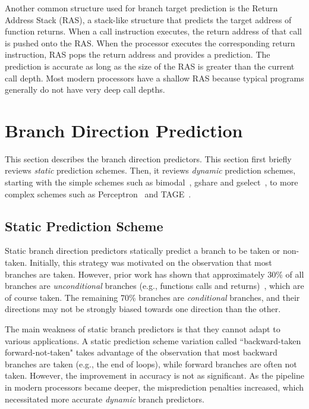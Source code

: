 Another common structure used for branch target prediction is the Return Address Stack (RAS),  a stack-like structure that predicts the target address of function returns. When a call instruction executes, the return address of that call is pushed onto the RAS. When the processor executes the corresponding return instruction, RAS pops the return address and provides a prediction. The prediction is accurate as long as the size of the RAS is greater than the current call depth. Most modern processors have a shallow RAS because typical programs generally do not have very deep call depths.


\section{Branch Direction Prediction}
\label{sec:background:dirpred}
This section describes the branch direction predictors. This section first briefly reviews \textit{static} prediction schemes. Then, it reviews \textit{dynamic} prediction schemes, starting with the simple schemes such as bimodal~\cite{bimodal}, gshare and gselect~\cite{McFarling}, to more complex schemes such as Perceptron~\cite{perceptron} and TAGE~\cite{tage}.

\subsection{Static Prediction Scheme}
\label{sec:background:dirpred:static}
Static branch direction predictors statically predict a branch to be taken or non-taken. Initially, this strategy was motivated on the observation that most branches are taken. However, prior work has shown that approximately 30\% of all branches are \textit{unconditional} branches (e.g., functions calls and returns)~\cite{histogram}, which are of course taken. The remaining 70\% branches are \textit{conditional} branches, and their directions may not be strongly biased towards one direction than the other.

The main weakness of static branch predictors is that they cannot adapt to various applications. A static prediction scheme variation called ``backward-taken forward-not-taken" takes advantage of the observation that most backward branches are taken (e.g., the end of loops), while forward branches are often not taken. However, the improvement in accuracy is not as significant. As the pipeline in modern processors became deeper, the misprediction penalties increased, which necessitated more accurate \textit{dynamic} branch predictors.

